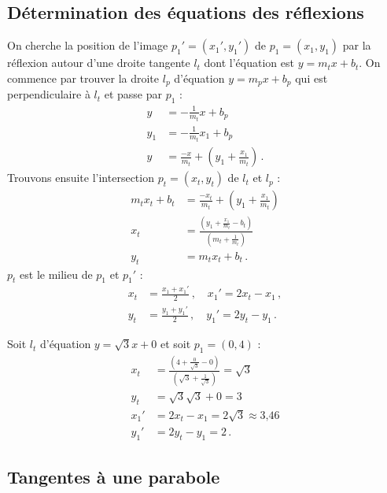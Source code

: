 
\subsection{Détermination des équations des réflexions}
On cherche la position de l'image  $p_1'=(x_1',y_1')$ de $p_1=(x_1,y_1)$ par la réflexion autour d'une droite tangente $l_t$ dont l'équation est $y=m_tx+b_t$. On commence par trouver la droite $l_p$ d'équation $y=m_px+b_p$ qui est perpendiculaire à $l_t$ et passe par $p_1$ :
\begin{align*}
y&=-\frac{1}{m_t}x+b_p\\
y_1&=-\frac{1}{m_t}x_1+b_p\\
y&=\frac{-x}{m_t}+\left(y_1+\frac{x_1}{m_t}\right)\,.
\end{align*}
Trouvons ensuite l'intersection $p_t=(x_t,y_t)$ de $l_t$ et $l_p$ :
%
\begin{align*}
m_tx_t+b_t&=\frac{-x_t}{m_t}+\left(y_1+\frac{x_1}{m_t}\right)\\
x_t&=\frac{\left(y_1+\displaystyle\frac{x_1}{m_t}-b_t\right)}{\left(m_t+\displaystyle\frac{1}{m_t}\right)}\\
y_t&=m_tx_t+b_t\,.
\end{align*}
$p_t$ est le milieu de  $p_1$ et $p_1'$ :
\begin{align*}
x_t&=\displaystyle\frac{x_1+x_1'}{2}\,,\quad  x_1'=2x_t-x_1\,,\\
y_t&=\displaystyle\frac{y_1+y_1'}{2}\,,\quad  y_1'=2y_t-y_1\,.
\end{align*}



\begin{example}
Soit $l_t$ d'équation $y=\sqrt{3}x+0$ et soit $p_1=(0,4)$ :
\begin{align*}
x_t&=\frac{\left(4+\displaystyle\frac{0}{\sqrt{3}}-0\right)}{\left(\sqrt{3}+\displaystyle\frac{1}{\sqrt{3}}\right)}=\sqrt{3}\\
y_t&=\sqrt{3}\sqrt{3}+0=3\\
x_1'&=2x_t-x_1=2\sqrt{3}\approx \mbox{3,46}\\
y_1'&=2y_t-y_1= 2\,.
\end{align*}
\end{example}


\subsection{Tangentes à une parabole}\label{s.parabola}

